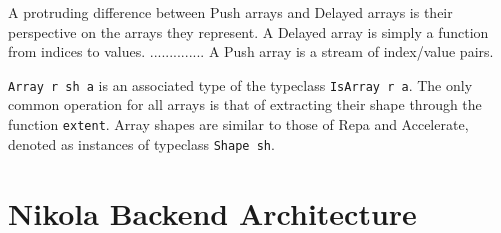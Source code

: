 A protruding difference between Push arrays and Delayed arrays is their
perspective on the arrays they represent. A Delayed array is simply a function
from indices to values. ..............
A Push array is a stream of index/value pairs.

\texttt{Array r sh a} is an associated type of the typeclass \texttt{IsArray r
a}. The only common operation for all arrays is that of extracting their shape
through the function \texttt{extent}. Array shapes are similar to those of
Repa and Accelerate, denoted as instances of typeclass \texttt{Shape sh}.

\section{Nikola Backend Architecture}

